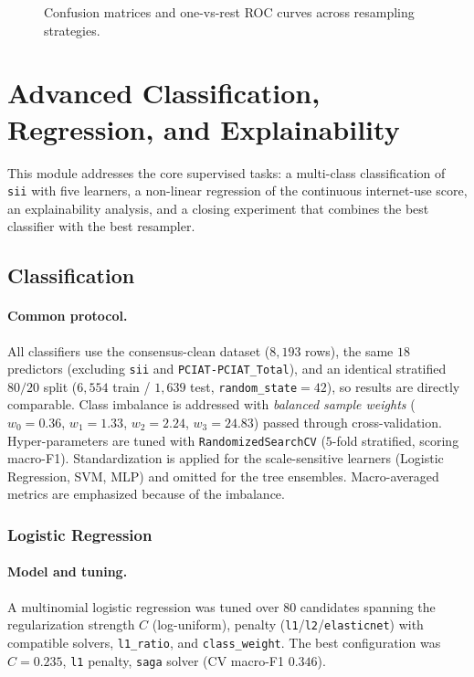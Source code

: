 \begin{figure}[h]
    \centering
    \caption{Confusion matrices and one-vs-rest ROC curves across resampling strategies.}
    \label{fig:cmi_imbalance_cm}
\end{figure}

\section{Advanced Classification, Regression, and Explainability}
This module addresses the core supervised tasks: a multi-class classification of \texttt{sii} with five learners, a non-linear regression of the continuous internet-use score, an explainability analysis, and a closing experiment that combines the best classifier with the best resampler.

\subsection{Classification}
\paragraph{Common protocol.} All classifiers use the consensus-clean dataset ($8{,}193$ rows), the same $18$ predictors (excluding \texttt{sii} and \texttt{PCIAT-PCIAT\_Total}), and an identical stratified $80/20$ split ($6{,}554$ train / $1{,}639$ test, \texttt{random\_state}$=42$), so results are directly comparable. Class imbalance is addressed with \emph{balanced sample weights} ($w_0{=}0.36$, $w_1{=}1.33$, $w_2{=}2.24$, $w_3{=}24.83$) passed through cross-validation. Hyper-parameters are tuned with \texttt{RandomizedSearchCV} ($5$-fold stratified, scoring macro-F1). Standardization is applied for the scale-sensitive learners (Logistic Regression, SVM, MLP) and omitted for the tree ensembles. Macro-averaged metrics are emphasized because of the imbalance.

\subsubsection{Logistic Regression}
\paragraph{Model and tuning.} A multinomial logistic regression \cite{sklearn} was tuned over $80$ candidates spanning the regularization strength $C$ (log-uniform), penalty (\texttt{l1}/\texttt{l2}/\texttt{elasticnet}) with compatible solvers, \texttt{l1\_ratio}, and \texttt{class\_weight}. The best configuration was $C=0.235$, \texttt{l1} penalty, \texttt{saga} solver (CV macro-F1 $0.346$).
